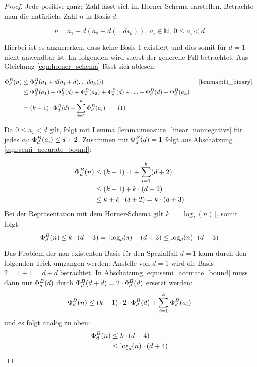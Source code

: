 \documentclass{article}
\theoremstyle{nonumberplain}
\newtheorem{proof}{Beweis}
\newcommand{\sidenote}[1]{&&|\ \text{#1}.}
\newcommand\numberthis{\addtocounter{equation}{1}\tag{\theequation}}
\begin{document}
\begin{proof}
    Jede positive ganze Zahl lässt sich im Horner-Schema darstellen.
    Betrachte man die natürliche Zahl \(n\) in Basis \(d\).

        \begin{equation}\label{eqn:horner_schema}
            n = a_1 + d (a_2 + d (\ldots d a_k)),\ a_i\in\mathbb{N},\ 0 \leq a_i < d
        \end{equation}

    Hierbei ist es anzumerken, dass keine Basis 1 existiert und dies somit für \(d=1\) nicht anwendbar ist.
    Im folgenden wird zuerst der generelle Fall betrachtet.
    Aus Gleichung \ref{eqn:horner_schema} lässt sich ablesen:

    \begin{align*}
        \measure{n} 
        &\leq \measure{a_1 + d (a_2 + d (\ldots d a_k))} \sidenote{\ref{lemma:phi_binary}} \\
        &\leq \measure{a_1} + \measure{d} + \measure{a_2} + \measure{d} + \ldots + \measure{d} + \measure{a_k} \\
        &= (k-1)\cdot\measure{d} + \sum_{i=1}^k \measure{a_i} \numberthis\label{eqn:semi_accurate_bound}
    \end{align*}
    
    Da \(0 \leq a_i < d\) gilt, folgt mit Lemma \ref{lemma:measure_linear_nonnegative} für jedes \(a_i\): \(\Phi_{d}^{B}(a_i) \leq d + 2\).
    Zusammen mit \(\Phi_{d}^{B}(d) = 1\) folgt aus Abschätzung \ref{eqn:semi_accurate_bound}:
    
    \begin{align*}
        \Phi_{d}^{B}(n) 
        &\leq (k-1) \cdot 1 + \sum_{i=1}^k (d+2) \\
        &\leq (k-1) + k \cdot (d+2) \\
        &\leq k + k \cdot (d+2) = k \cdot (d+3) \\
    \end{align*}
Bei der Repräsentation mit dem Horner-Schema gilt \(k = \lfloor \log_d(n) \rfloor\), somit folgt:
        \[\Phi_{d}^{B}(n) \leq k \cdot (d+3) = \lfloor \log_d(n) \rfloor \cdot (d+3) \leq \log_d(n) \cdot (d+3)\]

Das Problem der non-existenten Basis für den Spezialfall \(d = 1\) kann durch den folgenden Trick umgangen werden:
Anstelle von \(d = 1\) wird die  Basis \(2 = 1 + 1 = d + d\) betrachtet.   
In Abschätzung \ref{eqn:semi_accurate_bound} muss dann nur \(\Phi_{d}^{B}(d)\) durch \(\Phi_{d}^{B}(d + d) = 2\cdot\Phi_{d}^{B}(d)\) ersetzt werden:
    \[\Phi_{d}^{B}(n) \leq (k-1) \cdot 2 \cdot \Phi_{d}^{B}(d) + \sum_{i=1}^k \Phi_{d}^{B}(a_i)\]
und es folgt analog zu oben:
    \begin{align*}
        \Phi_{d}^{B}(n) 
        &\leq k \cdot (d+4) \\
        &\leq \log_d(n) \cdot (d+4) \\
    \end{align*}


\end{proof}
\end{document}
